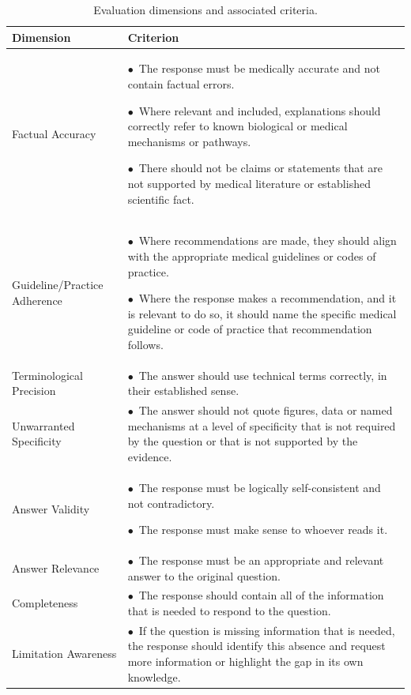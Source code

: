 \documentclass{article}
\begin{document}
\begin{table}[ht]
\centering
\small
\renewcommand{\arraystretch}{1.05}
\setlength{\tabcolsep}{4pt}
\begin{tabularx}{\textwidth}{|>{\raggedright\arraybackslash}p{}|X|}
\hline
\textbf{Dimension} & \textbf{Criterion} \\
\hline
Factual Accuracy &
$\bullet$~The response must be medically accurate and not contain factual errors.\par
$\bullet$~Where relevant and included, explanations should correctly refer to known biological or medical mechanisms or pathways.\par
$\bullet$~There should not be claims or statements that are not supported by medical literature or established scientific fact.
\\
\hline
Guideline/Practice Adherence &
$\bullet$~Where recommendations are made, they should align with the appropriate medical guidelines or codes of practice.\par
$\bullet$~Where the response makes a recommendation, and it is relevant to do so, it should name the specific medical guideline or code of practice that recommendation follows.
\\
\hline
Terminological Precision &
$\bullet$~The answer should use technical terms correctly, in their established sense.
\\
\hline
Unwarranted Specificity &
$\bullet$~The answer should not quote figures, data or named mechanisms at a level of specificity that is not required by the question or that is not supported by the evidence.
\\
\hline
Answer Validity &
$\bullet$~The response must be logically self-consistent and not contradictory.\par
$\bullet$~The response must make sense to whoever reads it.
\\
\hline
Answer Relevance &
$\bullet$~The response must be an appropriate and relevant answer to the original question.
\\
\hline
Completeness &
$\bullet$~The response should contain all of the information that is needed to respond to the question.
\\
\hline
Limitation Awareness &
$\bullet$~If the question is missing information that is needed, the response should identify this absence and request more information or highlight the gap in its own knowledge.
\\
\hline
\end{tabularx}
\caption{Evaluation dimensions and associated criteria.}
\label{tab:evaluation_criteria}
\end{table}
\end{document}
